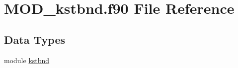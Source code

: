 \hypertarget{MOD__kstbnd_8f90}{\section{M\-O\-D\-\_\-kstbnd.\-f90 File Reference}
\label{MOD__kstbnd_8f90}
}
\subsection*{Data Types}
\begin{DoxyCompactItemize}
\item 
module \hyperlink{classkstbnd}{kstbnd}
\end{DoxyCompactItemize}
